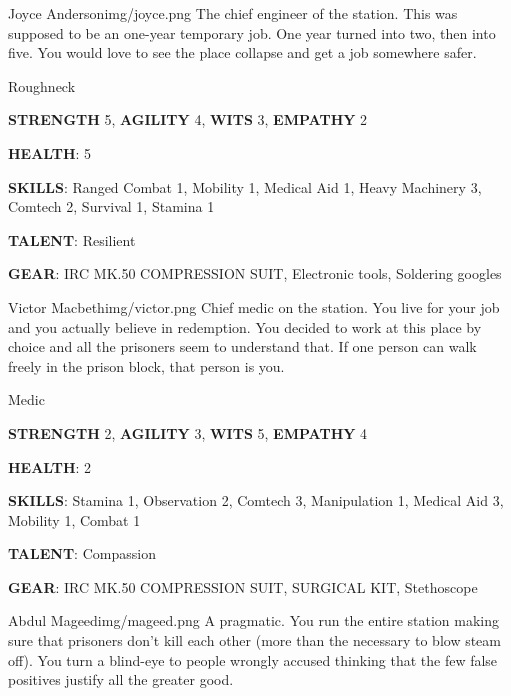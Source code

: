 
\begin{rpg-pcbox}{Joyce Anderson}{img/joyce.png}
    The chief engineer of the station. This was supposed to be an one-year temporary job. One year turned into two, then into five. You would love to see the place collapse and get a job somewhere safer.
\end{rpg-pcbox}

\begin{rpg-commentbox}{}
    Roughneck

    \textbf{STRENGTH} 5, \textbf{AGILITY} 4, \textbf{WITS} 3, \textbf{EMPATHY} 2

    \textbf{HEALTH}: 5

    \textbf{SKILLS}: Ranged Combat 1, Mobility 1, Medical Aid 1, Heavy Machinery 3, Comtech 2, Survival 1, Stamina 1
    
    \textbf{TALENT}: Resilient
    
    \textbf{GEAR}: IRC MK.50 COMPRESSION SUIT, Electronic tools, Soldering googles
\end{rpg-commentbox}

\newsect

\begin{rpg-pcbox}{Victor Macbeth}{img/victor.png}
    Chief medic on the station. You live for your job and you actually believe in redemption. You decided to work at this place by choice and all the prisoners seem to understand that. If one person can walk freely in the prison block, that person is you.
\end{rpg-pcbox}

\begin{rpg-commentbox}{}
    Medic

    \textbf{STRENGTH} 2, \textbf{AGILITY} 3, \textbf{WITS} 5, \textbf{EMPATHY} 4

    \textbf{HEALTH}: 2

    \textbf{SKILLS}: Stamina 1, Observation 2, Comtech 3, Manipulation 1, Medical Aid 3, Mobility 1, Combat 1
    
    \textbf{TALENT}: Compassion
    
    \textbf{GEAR}: IRC MK.50 COMPRESSION SUIT, SURGICAL KIT, Stethoscope
\end{rpg-commentbox}


\newsect

\medskip \medskip \medskip \medskip \medskip \medskip \medskip \medskip


\begin{rpg-pcbox}{Abdul Mageed}{img/mageed.png}
    A pragmatic. You run the entire station making sure that prisoners don't kill each other (more than the necessary to blow steam off). You turn a blind-eye to people wrongly accused thinking that the few false positives justify all the greater good.
\end{rpg-pcbox}

